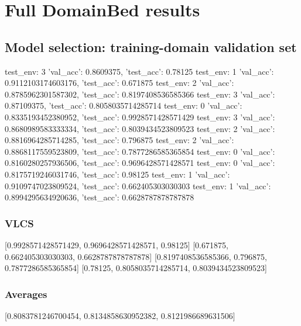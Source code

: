\documentclass{article}
\begin{document}
\section{Full DomainBed results}

\subsection{Model selection: training-domain validation set}
test_env: 3
{'val_acc': 0.8609375, 'test_acc': 0.78125}
test_env: 1
{'val_acc': 0.9112103174603176, 'test_acc': 0.671875}
test_env: 2
{'val_acc': 0.8785962301587302, 'test_acc': 0.8197408536585366}
test_env: 3
{'val_acc': 0.87109375, 'test_acc': 0.8058035714285714}
test_env: 0
{'val_acc': 0.8335193452380952, 'test_acc': 0.9928571428571429}
test_env: 3
{'val_acc': 0.8680989583333334, 'test_acc': 0.8039434523809523}
test_env: 2
{'val_acc': 0.8816964285714285, 'test_acc': 0.796875}
test_env: 2
{'val_acc': 0.8868117559523809, 'test_acc': 0.7877286585365854}
test_env: 0
{'val_acc': 0.8160280257936506, 'test_acc': 0.9696428571428571}
test_env: 0
{'val_acc': 0.8175719246031746, 'test_acc': 0.98125}
test_env: 1
{'val_acc': 0.9109747023809524, 'test_acc': 0.662405303030303}
test_env: 1
{'val_acc': 0.8994295634920636, 'test_acc': 0.6628787878787878}

\subsubsection{VLCS}
[0.9928571428571429, 0.9696428571428571, 0.98125]
[0.671875, 0.662405303030303, 0.6628787878787878]
[0.8197408536585366, 0.796875, 0.7877286585365854]
[0.78125, 0.8058035714285714, 0.8039434523809523]

\begin{center}
\end{center}

\subsubsection{Averages}
[0.8083781246700454, 0.8134858630952382, 0.8121986689631506]

\begin{center}
\end{center}
\end{document}
